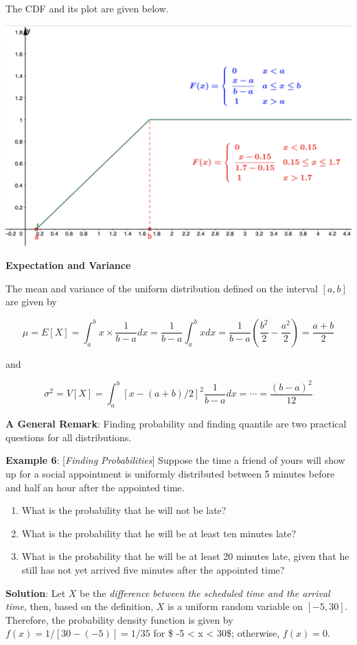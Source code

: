 \documentclass[
]{book}
\begin{document}
The CDF and its plot are given below.

\begin{center}\includegraphics[width=0.6\linewidth]{topic03/unifCDF} \end{center}

\textbf{Expectation and Variance}

The mean and variance of the uniform distribution defined on the interval \([a, b]\) are given by

\[
\mu = E[X] = \int_a^b x\times \frac{1}{b-a}dx = \frac{1}{b-a}\int_a^b xdx = \frac{1}{b-a}(\frac{b^2}{2} - \frac{a^2}{2}) = \frac{a + b}{2}
\]

and

\[
\sigma^2 = V[X] = \int_a^b [x-(a+b)/2]^2 \frac{1}{b-a}dx = \cdots = \frac{(b-a)^2}{12}
\]

\textbf{A General Remark}: Finding probability and finding quantile are two practical questions for all distributions.

\hfill\break

\textbf{Example 6}: {[}\emph{Finding Probabilities}{]} Suppose the time a friend of yours will show up for a social appointment is uniformly distributed between 5 minutes before and half an hour after the appointed time.

\begin{enumerate}
\def\labelenumi{\arabic{enumi}.}
\item
  What is the probability that he will not be late?
\item
  What is the probability that he will be at least ten minutes late?
\item
  What is the probability that he will be at least 20 minutes late, given that he still has not yet arrived five minutes after the appointed time?
\end{enumerate}

\textbf{Solution}: Let \(X\) be the \emph{difference between the scheduled time and the arrival time}, then, based on the definition, \(X\) is a uniform random variable on \([-5, 30]\). Therefore, the probability density function is given by \(f(x) = 1/[30 - (-5)] = 1/35\) for \$ -5 \textless{} x \textless{} 30\$; otherwise, \(f(x) = 0\).
\end{document}
